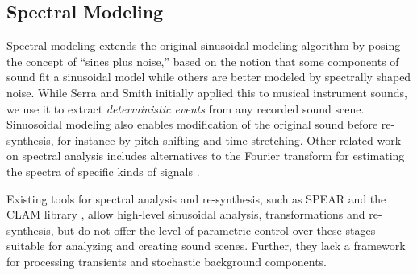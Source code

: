 \documentclass[a4paper]{article}
\begin{document}

\subsection{Spectral Modeling}

Spectral modeling \cite{Serra89} extends the original sinusoidal modeling algorithm 
\cite{McAulay86} by posing the concept of ``sines plus noise,'' based on the notion that 
some components of sound fit a sinusoidal model while others are better modeled by spectrally 
shaped noise. While Serra and Smith \cite{Serra89} initially applied this to musical instrument 
sounds, we use it to extract \emph{deterministic events} from any recorded sound scene. 
Sinuosoidal modeling also enables modification of the original sound before re-synthesis, for
instance by pitch-shifting and time-stretching.
Other related work on spectral analysis includes alternatives to 
the Fourier transform for estimating the spectra of specific kinds of 
signals \cite{Qi02,Thornburg03}. 

Existing tools for spectral analysis and re-synthesis, such as SPEAR \cite{Klingbeil05}
and the CLAM library \cite{Amatriain05}, allow high-level sinusoidal analysis, 
transformations and re-synthesis, but do not offer the level of parametric control over 
these stages suitable for analyzing and creating sound scenes. Further, they lack a 
framework for processing transients and stochastic background components.
\end{document}

